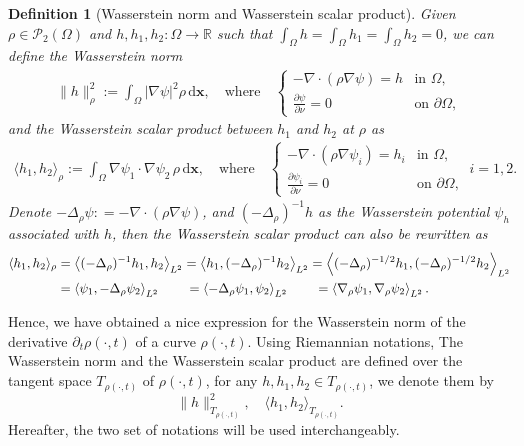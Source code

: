 \documentclass[11pt]{book}
\newtheorem{definition}[theorem]{Definition}
\newcommand{\dx}{\mathrm{d}\mathbf{x}}
\begin{document}
\begin{definition}[Wasserstein norm and Wasserstein scalar product]
Given \( \rho \in \mathcal{P}_2(\Omega) \) and \( h, h_1, h_2: \Omega \to \mathbb{R} \) such that 
\(\int_\Omega h = \int_\Omega h_1 = \int_\Omega h_2 = 0\), we can define the Wasserstein norm 
\begin{align}
    \| h \|^2_\rho := \int_\Omega |\nabla \psi|^2 \rho \, \dx, \quad \text{where} \quad
    \begin{cases}
        -\nabla\cdot(\rho \nabla \psi) = h & \text{in } \Omega, \\
        \frac{\partial \psi}{\partial \nu} = 0 & \text{on } \partial \Omega,
    \end{cases}
\end{align}
and the Wasserstein scalar product between $h_1$ and $h_2$ at $\rho$ as 
\begin{align}\label{eqn:Wasserstein_scalarproduct}
    \langle h_1, h_2 \rangle_\rho := \int_\Omega \nabla \psi_1 \cdot \nabla \psi_2 \, \rho \, \dx, 
    \quad \text{where} \quad 
    \begin{cases}
        -\nabla\cdot(\rho \nabla \psi_i) = h_i & \text{in } \Omega, \\
        \frac{\partial \psi_i}{\partial \nu} = 0 & \text{on } \partial \Omega,
    \end{cases}
    \ i = 1,2.
\end{align}
Denote $-\Delta_{\rho}\psi: = -\nabla\cdot(\rho\nabla\psi)$, and $(-\Delta_{\rho})^{-1}h$ as the Wasserstein potential $\psi_h$ associated with $h$, then the Wasserstein scalar product can also be rewritten as
\begin{align}
    \langle h_1,h_2 \rangle_{\rho} 
    &= \left\langle (-\Delta_{\rho})^{-1}h_1, h_2  \right\rangle_{L^2} 
    = \left\langle h_1, (-\Delta_{\rho})^{-1}h_2  \right\rangle_{L^2} 
    = \left\langle (-\Delta_{\rho})^{-1/2}h_1, (-\Delta_{\rho})^{-1/2}h_2  \right\rangle_{L^2} \label{eqn:Wasserstein_scalarproduct02} \\
    &= \left\langle \psi_1, -\Delta_{\rho}\psi_2  \right\rangle_{L^2} 
    \hspace{0.29in}
    = \left\langle -\Delta_{\rho} \psi_1, \psi_2  \right\rangle_{L^2} 
    \hspace{0.29in}
    = \left\langle \nabla_{\rho}\psi_1,\nabla_{\rho}\psi_2  \right\rangle_{L^2} .
\end{align}
\end{definition}
Hence, we have obtained a nice expression for the Wasserstein norm of the derivative $\partial_t\rho(\cdot,t)$ of a curve $\rho(\cdot,t)$. Using Riemannian notations, The Wasserstein norm and the Wasserstein scalar product are defined over the tangent space $T_{\rho(\cdot,t)}$ of $\rho(\cdot,t)$, for any $h, h_1, h_2 \in T_{\rho(\cdot,t)}$, we denote them by
\[
\|h\|_{T_{\rho(\cdot,t)}}^2, \quad \langle h_1, h_2 \rangle_{T_{\rho(\cdot,t)}}.
\]
Hereafter, the two set of notations will be used interchangeably.
\end{document}
